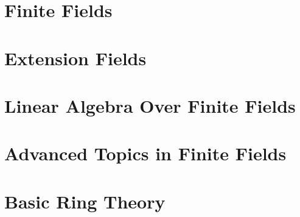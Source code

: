 \bigskip




\clearpage



\section{Finite Fields}
\label{sec:finite:fields}





\bigskip




\clearpage







\section{Extension Fields}
\label{sec:extension:fields}





\bigskip




\clearpage


\section{Linear Algebra Over Finite Fields}
\label{sec:linear:algebra}






\bigskip
\clearpage


\section{Advanced Topics in Finite Fields}
\label{sec:finite:field:advanced}






\bigskip
\clearpage


\section{Basic Ring Theory}
\label{sec:ring:theory:basic}






\bigskip
\clearpage


